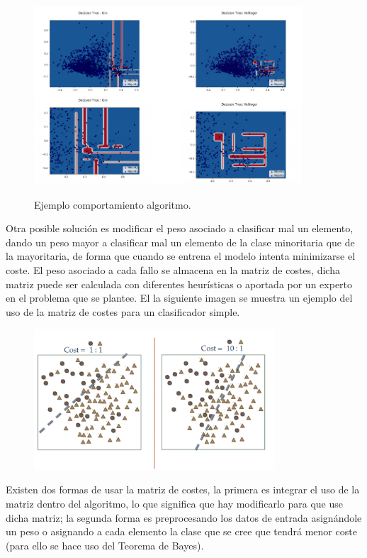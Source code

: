 \begin{figure}[h]
	\centering
	\includegraphics[width=100mm]{imagenes/hellinger-example.png}
	\label{fig:25}
	\caption{Ejemplo comportamiento algoritmo.}
\end{figure}
\verticalspace

Otra posible solución es modificar el peso asociado a clasificar mal un elemento, dando un peso mayor a clasificar mal un elemento de la clase minoritaria que de la mayoritaria, de forma que cuando se entrena el modelo intenta minimizarse el coste. El peso asociado a cada fallo se almacena en la matriz de costes, dicha matriz puede ser calculada con diferentes heurísticas o aportada por un experto en el problema que se plantee. El la siguiente imagen se muestra un ejemplo del uso de la matriz de costes para un clasificador simple.\newline

\begin{figure}[h]
	\centering
	\includegraphics[width=90mm]{imagenes/cost-sentitive.png}
	\label{fig:26}
\end{figure}
\verticalspace

Existen dos formas de usar la matriz de costes, la primera es integrar el uso de la matriz dentro del algoritmo, lo que significa que hay modificarlo para que use dicha matriz; la segunda forma es preprocesando los datos de entrada asignándole un peso o asignando a cada elemento la clase que se cree que tendrá menor coste (para ello se hace uso del Teorema de Bayes).
